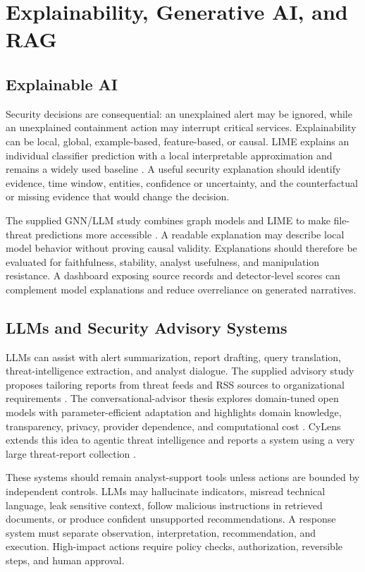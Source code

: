 \documentclass[conference]{IEEEtran}
\begin{document}
\section{Explainability, Generative AI, and RAG}
\subsection{Explainable AI}
Security decisions are consequential: an unexplained alert may be ignored, while an unexplained containment action may interrupt critical services. Explainability can be local, global, example-based, feature-based, or causal. LIME explains an individual classifier prediction with a local interpretable approximation and remains a widely used baseline \cite{Ribeiro2016}. A useful security explanation should identify evidence, time window, entities, confidence or uncertainty, and the counterfactual or missing evidence that would change the decision.

The supplied GNN/LLM study combines graph models and LIME to make file-threat predictions more accessible \cite{Balaji2025}. A readable explanation may describe local model behavior without proving causal validity. Explanations should therefore be evaluated for faithfulness, stability, analyst usefulness, and manipulation resistance. A dashboard exposing source records and detector-level scores can complement model explanations and reduce overreliance on generated narratives.

\subsection{LLMs and Security Advisory Systems}
LLMs can assist with alert summarization, report drafting, query translation, threat-intelligence extraction, and analyst dialogue. The supplied advisory study proposes tailoring reports from threat feeds and RSS sources to organizational requirements \cite{Abeywardena2023}. The conversational-advisor thesis explores domain-tuned open models with parameter-efficient adaptation and highlights domain knowledge, transparency, privacy, provider dependence, and computational cost \cite{Zhivonitko2026}. CyLens extends this idea to agentic threat intelligence and reports a system using a very large threat-report collection \cite{Liu2025}.

These systems should remain analyst-support tools unless actions are bounded by independent controls. LLMs may hallucinate indicators, misread technical language, leak sensitive context, follow malicious instructions in retrieved documents, or produce confident unsupported recommendations. A response system must separate observation, interpretation, recommendation, and execution. High-impact actions require policy checks, authorization, reversible steps, and human approval.
\end{document}
